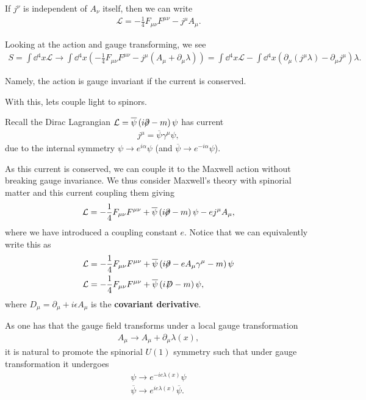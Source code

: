 If $j^{\nu}$ is independent of $A_\nu$ itself, then we can write
\begin{align}
    \mathcal{L} = -\frac{1}{4} F_{\mu \nu} F^{\mu \nu} - j^{\mu} A_\mu
.\end{align}

Looking at the action and gauge transforming, we see
\begin{align}
    S = \int \dd{^4x} \mathcal{L} \to \int \dd{^{4}x} \left( -\frac{1}{4} F_{\mu \nu} F^{\mu \nu} - j^{\mu} \left( A_\mu + \partial_\mu \lambda \right)   \right)  = \int \dd{^4x } \mathcal{L} - \int \dd{^4x} \left( \partial_\mu \left( j^{\mu} \lambda \right) - \partial_\mu j^{\mu} \right) \lambda
.\end{align}

Namely, the action is gauge invariant if the current is conserved.

With this, lets couple light to spinors.

Recall the Dirac Lagrangian $\mathcal{L} = \overline{\psi} \left( i \fbs{\partial} - m \right) \psi$ has current
\begin{align}
    j^{\mu} = \overline{\psi}\gamma^{\mu} \psi
,\end{align}
due to the internal symmetry $\psi \to e^{i \alpha} \psi$ (and $\overline{\psi} \to e^{-i\alpha} \psi$).

As this current is conserved, we can couple it to the Maxwell action without breaking gauge invariance. We thus consider Maxwell's theory with spinorial matter and this current coupling them giving
\begin{align}
    \mathcal{L} = -\frac{1}{4} F_{\mu \nu} F^{\mu \nu} + \overline{\psi} \left( i \fbs{\partial} - m  \right) \psi - e j^{\mu} A_\mu
,\end{align}
where we have introduced a coupling constant $e$. Notice that we can equivalently write this as
\begin{align}
    \mathcal{L} &=  -\frac{1}{4} F_{\mu \nu} F^{\mu \nu} + \overline{\psi} \left( i \fbs{\partial} - e A_\mu \gamma^{\mu} - m  \right) \psi \\
    \mathcal{L} &= -\frac{1}{4} F_{\mu \nu} F^{\mu \nu} + \overline{\psi} \left( i \fbs{D} - m \right) \psi 
,\end{align}
where $D_{\mu} = \partial_\mu + i \epsilon A_\mu$ is the \textbf{covariant derivative}.

As one has that the gauge field transforms under a local gauge transformation
\begin{align}
    A_\mu \to A_\mu + \partial_\mu \lambda \left( x \right) 
,\end{align}
it is natural to promote the spinorial $U\left( 1 \right) $ symmetry such that under gauge transformation it undergoes
\begin{align}
    \psi \to e^{-i e \lambda \left( x \right) }\psi \\
    \overline{\psi} \to e^{ie \lambda \left( x \right) }\overline{\psi}
.\end{align}

